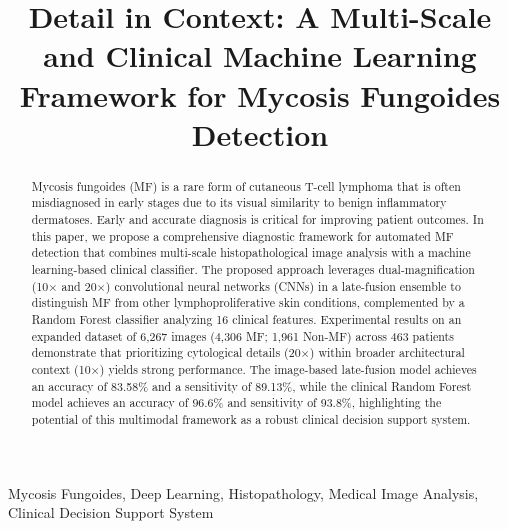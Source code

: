 \documentclass[conference]{IEEEtran}
\begin{document}
\title{Detail in Context: A Multi-Scale and Clinical Machine Learning Framework for Mycosis Fungoides Detection
}

\author{
    \vspace{0.15cm}
}

\maketitle

\begin{abstract}
    Mycosis fungoides (MF) is a rare form of cutaneous T-cell lymphoma that is often misdiagnosed 
    in early stages due to its visual similarity to benign inflammatory dermatoses. 
    Early and accurate diagnosis is critical for improving patient outcomes. 
    In this paper, we propose a comprehensive diagnostic framework for automated MF detection 
    that combines multi-scale histopathological image analysis with a machine learning-based clinical classifier. 
    The proposed approach leverages dual-magnification (10$\times$ and 20$\times$) convolutional neural networks (CNNs) 
    in a late-fusion ensemble to distinguish MF from other lymphoproliferative skin conditions, 
    complemented by a Random Forest classifier analyzing 16 clinical features. 
    Experimental results on an expanded dataset of 6,267 images (4,306 MF; 1,961 Non-MF) across 463 patients 
    demonstrate that prioritizing cytological details (20$\times$) within broader architectural context (10$\times$) yields strong 
    performance. The image-based late-fusion model achieves an accuracy of 83.58\% and a sensitivity of 89.13\%, 
    while the clinical Random Forest model achieves an accuracy of 96.6\% and sensitivity of 93.8\%, 
    highlighting the potential of this multimodal framework as a robust clinical decision support system.
\end{abstract}

\begin{IEEEkeywords}
    Mycosis Fungoides, Deep Learning, Histopathology, Medical Image Analysis, Clinical Decision Support System
\end{IEEEkeywords}
\end{document}
